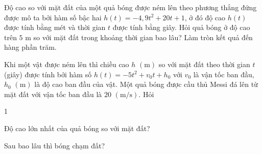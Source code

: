\begin{bt}%
	Độ cao so với mặt đất của một quả bóng được ném lên theo phương thẳng đứng được mô ta bởi hàm số bậc hai $h(t)=-4{,}9t^2+20t+1$, ở đó độ cao $h(t)$ được tính bằng mét và thời gian $t$ được tính bằng giây. Hỏi quả bóng ở độ cao trên $5$ m so với mặt đất trong khoảng thời gian bao lâu? Làm tròn kết quả đến hàng phần trăm.
\end{bt}

\begin{bt}%
	Khi một vật được ném lên thì chiều cao $h$ $\mathrm{(m)}$ so với mặt đất theo thời gian $t$ (giây) được tính bởi hàm số $h(t)=-5t^2+v_0t+h_0$ với $v_0$ là vận tốc ban đầu, $h_0$ $\mathrm{(m)}$ là độ cao ban đầu của vật. Một quả bóng được cầu thủ Messi đá lên từ mặt đất với vận tốc ban đầu là $20$ $\mathrm{(m/s)}$. Hỏi
	\begin{enumEX}{1}
		\item Độ cao lớn nhất của quả bóng so với mặt đất?
		\item Sau bao lâu thì bóng chạm đất?
	\end{enumEX}
\end{bt}

